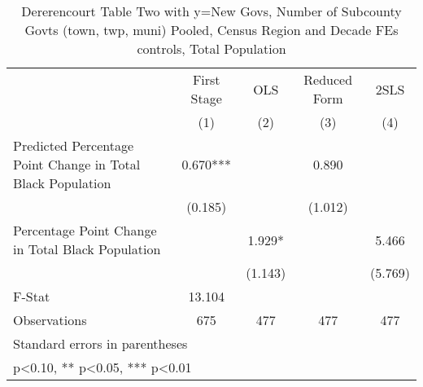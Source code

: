 \begin{table}[htbp]\centering
\def\sym#1{\ifmmode^{#1}\else\(^{#1}\)\fi}
\caption{Dererencourt Table Two with y=New Govs, Number of Subcounty Govts (town, twp, muni)  Pooled, Census Region and Decade FEs controls, Total Population}
\begin{tabular}{l*{4}{c}}
\toprule
                    & First Stage   &         OLS   &Reduced Form   &        2SLS   \\
                    &\multicolumn{1}{c}{(1)}   &\multicolumn{1}{c}{(2)}   &\multicolumn{1}{c}{(3)}   &\multicolumn{1}{c}{(4)}   \\
\midrule
Predicted Percentage Point Change in Total Black Population&       0.670***&               &       0.890   &               \\
                    &     (0.185)   &               &     (1.012)   &               \\
\addlinespace
Percentage Point Change in Total Black Population&               &       1.929*  &               &       5.466   \\
                    &               &     (1.143)   &               &     (5.769)   \\
\midrule
F-Stat              &      13.104   &               &               &               \\
Observations        &         675   &         477   &         477   &         477   \\
\bottomrule
\multicolumn{5}{l}{\footnotesize Standard errors in parentheses}\\
\multicolumn{5}{l}{\footnotesize * p<0.10, ** p<0.05, *** p<0.01}\\
\end{tabular}
\end{table}
